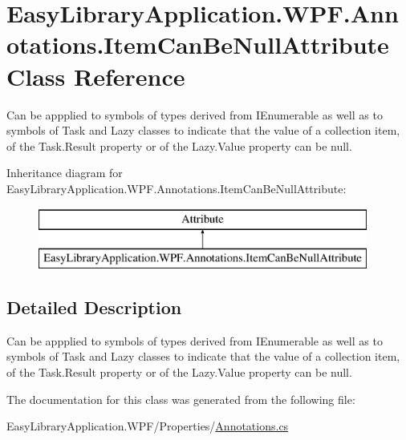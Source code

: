 \hypertarget{class_easy_library_application_1_1_w_p_f_1_1_annotations_1_1_item_can_be_null_attribute}{}\section{Easy\+Library\+Application.\+W\+P\+F.\+Annotations.\+Item\+Can\+Be\+Null\+Attribute Class Reference}
\label{class_easy_library_application_1_1_w_p_f_1_1_annotations_1_1_item_can_be_null_attribute}


Can be appplied to symbols of types derived from I\+Enumerable as well as to symbols of Task and Lazy classes to indicate that the value of a collection item, of the Task.\+Result property or of the Lazy.\+Value property can be null.  


Inheritance diagram for Easy\+Library\+Application.\+W\+P\+F.\+Annotations.\+Item\+Can\+Be\+Null\+Attribute\+:\begin{figure}[H]
\begin{center}
\leavevmode
\includegraphics[height=2.000000cm]{class_easy_library_application_1_1_w_p_f_1_1_annotations_1_1_item_can_be_null_attribute}
\end{center}
\end{figure}


\subsection{Detailed Description}
Can be appplied to symbols of types derived from I\+Enumerable as well as to symbols of Task and Lazy classes to indicate that the value of a collection item, of the Task.\+Result property or of the Lazy.\+Value property can be null. 



The documentation for this class was generated from the following file\+:\begin{DoxyCompactItemize}
\item 
Easy\+Library\+Application.\+W\+P\+F/\+Properties/\mbox{\hyperlink{_annotations_8cs}{Annotations.\+cs}}\end{DoxyCompactItemize}
